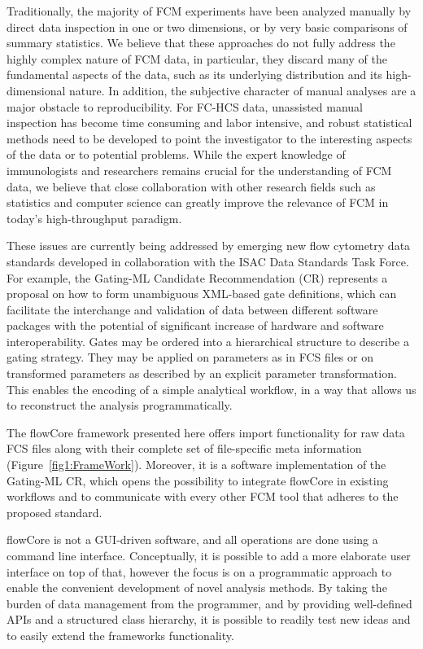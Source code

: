 \documentclass[12pt]{article}
\begin{document}
Traditionally, the majority of FCM experiments have been analyzed
manually by direct data inspection in one or two dimensions, or by
very basic comparisons of summary statistics. We believe that these
approaches do not fully address the highly complex nature of FCM data,
in particular, they discard many of the fundamental aspects of the
data, such as its underlying distribution and its high-dimensional
nature. In addition, the subjective character of manual analyses are a
major obstacle to reproducibility. For FC-HCS data, unassisted manual
inspection has become time consuming and labor intensive, and robust
statistical methods need to be developed to point the investigator to
the interesting aspects of the data or to potential problems. While
the expert knowledge of immunologists and researchers remains crucial
for the understanding of FCM data, we believe that close collaboration
with other research fields such as statistics and computer science can
greatly improve the relevance of FCM in today's high-throughput
paradigm.

These issues are currently being addressed by emerging new flow
cytometry data standards developed in collaboration with the ISAC Data
Standards Task Force.  For example, the Gating-ML Candidate Recommendation (CR)
represents a proposal on how to form unambiguous XML-based gate
definitions, which can facilitate the interchange and validation of
data between different software packages with the potential of
significant increase of hardware and software interoperability. Gates
may be ordered into a hierarchical structure to describe a gating
strategy. They may be applied on parameters as in FCS files or on
transformed parameters as described by an explicit parameter
transformation. 
This enables the encoding of a simple analytical workflow, in a way
that allows us to reconstruct the analysis programmatically.

The flowCore framework presented here offers import functionality for
raw data FCS files along with their complete set of file-specific meta
information (Figure~\ref{fig1:FrameWork}). Moreover, it is a software
implementation of the Gating-ML CR, which opens the possibility to
integrate flowCore in existing workflows and to communicate with
every other FCM tool that adheres to the proposed
standard. 

flowCore is not a GUI-driven software, and all operations are done
using a command line interface. Conceptually, it is possible to add a
more elaborate user interface on top of that, however the focus is on
a programmatic approach to enable the convenient development of novel
analysis methods. By taking the burden of data management from the
programmer, and by providing well-defined APIs and a structured class
hierarchy, it is possible to readily test new ideas and to easily
extend the frameworks functionality. %
\end{document}

